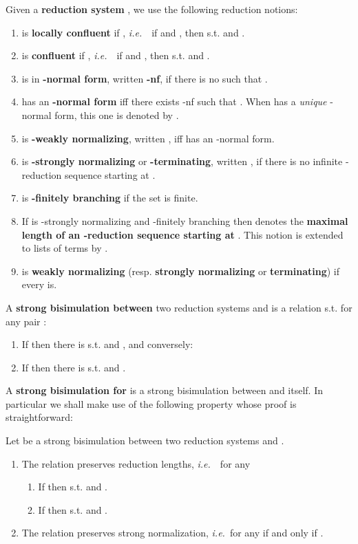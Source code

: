 \documentclass{LMCS}
\newcommand{\ie}{{\it  i.e.}~}
\renewcommand{\>}{\rightarrow}
\newcommand{\deft}[1]{{\bf #1}}
\begin{document}
Given a \deft{reduction system} ,  we use the following reduction notions: 
\begin{enumerate}[]
  \item  is \deft{locally confluent} if 
,  \ie\ 
if  and , then  s.t.
 and .
 \item  is \deft{confluent} if ,  \ie\ 
if  and , then  s.t.
 and .
\item  is in \deft{-normal form}, written  \deft{-nf}, if there is no  such that .  
\item  has an \deft{-normal form} iff there exists -nf
such that . 
When   has a \textit{unique} -normal form, this one is denoted by .
\item  is  \deft{-weakly normalizing}, written ,
iff  has an  -normal form.
\item     is  \deft{-strongly  normalizing} or
\deft{-terminating},   written  , if  there is no infinite  -reduction sequence starting
  at  .
 \item    is  \deft{-finitely branching}
       if the set  is finite.
\item If  is  -strongly  normalizing
and -finitely branching
then   
denotes  the
  \deft{maximal length of an -reduction sequence starting at }.
  This notion is  extended to  lists of terms
   by .
\item  is \deft{weakly normalizing} (resp. \deft{strongly  normalizing} or \deft{terminating})
if every  is.
\end{enumerate}

A \deft{strong bisimulation between} two
reduction
systems 
 and  is a
relation  s.t. for any pair
:
\begin{enumerate}[]
   \item If  then 
        there is   s.t. 
         and , and conversely:
   \item If  then there is  s.t.  and .
  \end{enumerate}

A  \deft{strong bisimulation for } is a 
strong bisimulation between  and itself.
In particular we shall make use of the following property 
 whose proof is straightforward:

\begin{lem}
\label{l:lamj-bis-psn-dif-sys}
Let  be a strong bisimulation between two reduction systems 
 and . 
\begin{enumerate}
  \item The relation  preserves reduction lengths, \ie\ for any  
\begin{enumerate}[]
\item If  then 
       s.t.  and .
\item If  then  
       s.t.  and .
\end{enumerate}
\item \label{l:sbisim-pres-psn}The relation  preserves strong normalization, \ie for any  if and only if .
\end{enumerate}
\end{lem}
\end{document}
